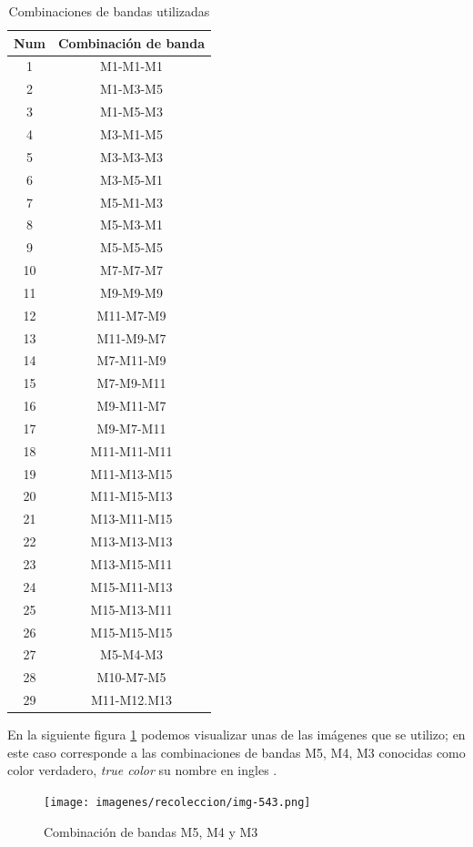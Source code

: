 \begin{table}[H] \begin{center}
\begin{tabular}{|c|c|}\hline 
Num & Combinación de banda\\ \hline 
1  	& 	M1-M1-M1 	\\ \hline
2  	&   M1-M3-M5	\\  \hline
3  	& 	M1-M5-M3	\\ \hline
4  	&   M3-M1-M5 	\\ \hline
5   & 	M3-M3-M3 	\\ \hline
6   & 	M3-M5-M1 	\\ \hline
7   & 	M5-M1-M3 	\\ \hline
8   & 	M5-M3-M1 	\\ \hline
9   &   M5-M5-M5  	\\ \hline
10  &	M7-M7-M7   	\\ \hline
11  & 	M9-M9-M9   	\\ \hline
12  & 	M11-M7-M9  	\\ \hline
13  & 	M11-M9-M7  	\\ \hline
14  &  	M7-M11-M9  	\\ \hline
15  & 	M7-M9-M11  	\\ \hline
16  & 	M9-M11-M7  	\\ \hline
17  & 	M9-M7-M11  	\\ \hline
18  & 	M11-M11-M11	\\ \hline
19  & 	M11-M13-M15 \\ \hline
20  & 	M11-M15-M13 \\ \hline
21  & 	M13-M11-M15 \\ \hline
22  & 	M13-M13-M13	\\ \hline
23  & 	M13-M15-M11 \\ \hline
24  & 	M15-M11-M13	\\ \hline
25  & 	M15-M13-M11	\\ \hline
26  & 	M15-M15-M15 \\ \hline
27  & 	M5-M4-M3 	\\ \hline
28  & 	M10-M7-M5 	\\ \hline   
29  & 	M11-M12.M13	\\ \hline        	
\end{tabular}
\end{center}\caption{Combinaciones de bandas utilizadas \label{tab:combinacion_banda}}
\end{table}

En la siguiente figura \ref{Fig: bandas543} podemos visualizar unas de las imágenes que se utilizo; en este caso corresponde  a las combinaciones de bandas M5, M4, M3 conocidas como color verdadero, \textit{true color} su nombre en ingles .

\begin{figure}[H]
 \centering
  \texttt{[image: imagenes/recoleccion/img-543.png]}
  \caption{Combinación de bandas M5, M4 y M3}
	\label{Fig: bandas543}
\end{figure}

